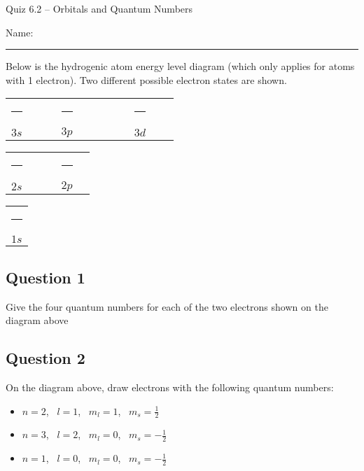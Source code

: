 \documentclass[11pt, letterpaper]{memoir}
\begin{document}
	\begin{center}
		{\large	Quiz 6.2 -- Orbitals and Quantum Numbers}
	\end{center}
{\large Name: \rule[-1mm]{4in}{.1pt}
	
	
	\noindent Below is the hydrogenic atom energy level diagram (which only applies for atoms with 1 electron). Two different possible electron states are shown.
	\begin{center}
		
		
		
		{\large
		\begin{tabular}{ccccccccccc}
			\rule[-1pt]{1.75em}{0.5pt} &~&\rule[-1pt]{1.75em}{0.5pt}&\rule[-1pt]{1.75em}{0.5pt}&\rule[-1pt]{1.75em}{0.5pt} &~& \rule[-1pt]{1.75em}{0.5pt}&\rule[-1pt]{1.75em}{0.5pt}&\rule[-1pt]{1.75em}{0.5pt}&\rule[-1pt]{1.75em}{0.5pt}&\rule[-1pt]{1.75em}{0.5pt}\\
			{$3s$} &&&{$3p$} &&&&&{$3d$}
		\end{tabular}
		
	
		
		\begin{tabular}{ccccc}
			\rule[-1pt]{1.75em}{0.5pt} &~&\rule[-1pt]{1.75em}{0.5pt}&\rule[-1pt]{1.75em}{0.5pt}&\rule[-1pt]{1.75em}{0.5pt}\\
			{$2s$} &&&{$2p$}
		\end{tabular}
		
		
		
		\begin{tabular}{c}
			\rule[-1pt]{1.75em}{0.5pt} \\
			{$1s$}
		\end{tabular}
		}
	\end{center}

	\subsection*{Question 1}
	Give the four quantum numbers for each of the two electrons shown on the diagram above
	
	\vspace{2em}
	\subsection*{Question 2}
	On the diagram above, draw electrons with the following quantum numbers:
	\begin{itemize}
		\item $n=2$, ~$l=1$, ~$m_l=1$, ~$m_s=\frac{1}{2}$
		\item $n=3$, ~$l=2$, ~$m_l=0$, ~$m_s=-\frac{1}{2}$
		\item $n=1$, ~$l=0$, ~$m_l=0$, ~$m_s=-\frac{1}{2}$
	\end{itemize}
	
}
\end{document}
